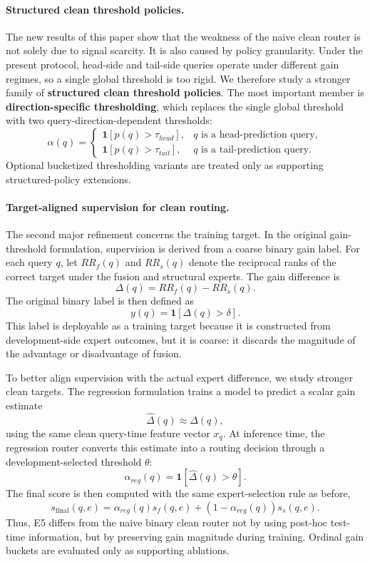 \documentclass[11pt]{article}
\begin{document}
\paragraph{Structured clean threshold policies.} The new results of this paper show that the weakness of the naive clean router is not solely due to signal scarcity. It is also caused by policy granularity. Under the present protocol, head-side and tail-side queries operate under different gain regimes, so a single global threshold is too rigid. We therefore study a stronger family of \textbf{structured clean threshold policies}. The most important member is \textbf{direction-specific thresholding}, which replaces the single global threshold with two query-direction-dependent thresholds:
\[
\alpha(q)=
\begin{cases}
\mathbf{1}[p(q)>\tau_{head}], & q \text{ is a head-prediction query}, \\
\mathbf{1}[p(q)>\tau_{tail}], & q \text{ is a tail-prediction query}.
\end{cases}
\]
Optional bucketized thresholding variants are treated only as supporting structured-policy extensions.

\paragraph{Target-aligned supervision for clean routing.} The second major refinement concerns the training target. In the original gain-threshold formulation, supervision is derived from a coarse binary gain label. For each query $q$, let $RR_f(q)$ and $RR_s(q)$ denote the reciprocal ranks of the correct target under the fusion and structural experts. The gain difference is
\[
\Delta(q)=RR_f(q)-RR_s(q).
\]
The original binary label is then defined as
\[
y(q)=\mathbf{1}[\Delta(q)>\delta].
\]
This label is deployable as a training target because it is constructed from development-side expert outcomes, but it is coarse: it discards the magnitude of the advantage or disadvantage of fusion.

To better align supervision with the actual expert difference, we study stronger clean targets. The regression formulation trains a model to predict a scalar gain estimate
\[
\widehat{\Delta}(q) \approx \Delta(q),
\]
using the same clean query-time feature vector $x_q$. At inference time, the regression router converts this estimate into a routing decision through a development-selected threshold $\theta$:
\[
\alpha_{reg}(q)=\mathbf{1}[\widehat{\Delta}(q)>\theta].
\]
The final score is then computed with the same expert-selection rule as before,
\[
s_{\text{final}}(q,e)=\alpha_{reg}(q)s_f(q,e)+(1-\alpha_{reg}(q))s_s(q,e).
\]
Thus, E5 differs from the naive binary clean router not by using post-hoc test-time information, but by preserving gain magnitude during training. Ordinal gain buckets are evaluated only as supporting ablations.
\end{document}
